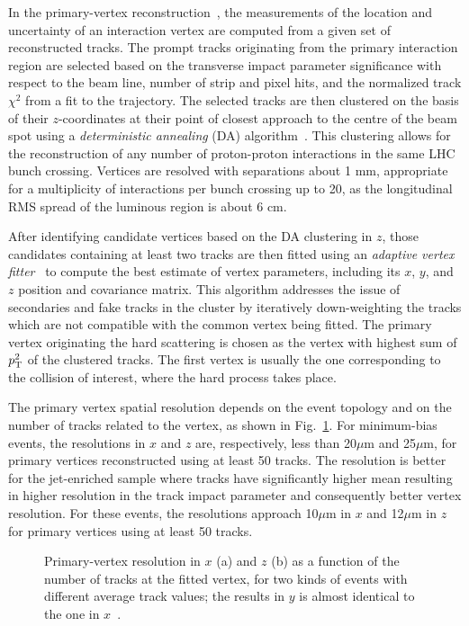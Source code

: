 In the primary-vertex reconstruction~\cite{Speer:927395}, the measurements of the location and uncertainty of an interaction vertex are computed from a given set of reconstructed tracks. The prompt tracks originating from the primary interaction region are selected based on the transverse impact parameter significance with respect to the beam line, number of strip and pixel hits, and the normalized track $\chi^2$ from a fit to the trajectory. The selected tracks are then clustered on the basis of their $z$-coordinates at their point of closest approach to the centre of the beam spot using a {\itshape deterministic annealing} (DA) algorithm~\cite{726788}.
This clustering allows for the reconstruction of any number of proton-proton interactions in the same LHC bunch crossing. Vertices are resolved with separations about 1 mm, appropriate for a multiplicity of interactions per bunch crossing up to 20, as the longitudinal RMS spread of the luminous region is about 6 cm.

After identifying candidate vertices based on the DA clustering in $z$, those candidates containing at least two tracks are then fitted using an {\itshape adaptive vertex fitter}~\cite{0954-3899-34-12-N01} to compute the best
estimate of vertex parameters, including its $x$, $y$, and $z$ position and covariance matrix. This algorithm addresses the issue of secondaries and fake tracks in the cluster by iteratively down-weighting the tracks which are not compatible with the common vertex being fitted. The primary vertex originating the hard scattering is chosen as the vertex with highest sum of $p_{\mathrm{T}}^2$ of the clustered tracks. The first vertex is usually the one corresponding to the collision of interest, where the hard process takes place.

The primary vertex spatial resolution depends on the event topology and on the number of tracks related to the vertex, as shown in Fig.~\ref{fig:vtx_rel}. For minimum-bias events, the resolutions in $x$ and $z$ are, respectively, less than 20$\mu$m and 25$\mu$m, for primary vertices reconstructed using at least 50 tracks. The resolution is better for the jet-enriched sample where tracks have significantly higher mean \pt resulting in higher resolution in the track impact parameter and consequently better vertex resolution. For these events, the resolutions approach 10$\mu$m in $x$ and 12$\mu$m in $z$ for primary vertices using at least 50 tracks.

\begin{figure}[!htb]
\centering
{}
\caption{Primary-vertex resolution in $x$ (a) and $z$ (b) as a function of the number of tracks at the fitted vertex, for two kinds of events with different average track \pt values; the results in $y$ is almost identical to the one in $x$~\cite{TrkCMSPublicResults}.}
\label{fig:vtx_rel}
\end{figure}